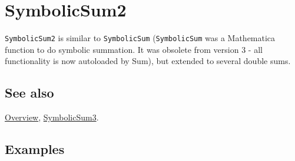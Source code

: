 \documentclass[../FeynCalcManual.tex]{subfiles}
\begin{document}
\hypertarget{symbolicsum2}{%
\section{SymbolicSum2}\label{symbolicsum2}}

\texttt{SymbolicSum2} is similar to \texttt{SymbolicSum}
(\texttt{SymbolicSum} was a Mathematica function to do symbolic
summation. It was obsolete from version 3 - all functionality is now
autoloaded by Sum), but extended to several double sums.

\subsection{See also}

\hyperlink{toc}{Overview}, \hyperlink{symbolicsum3}{SymbolicSum3}.

\subsection{Examples}
\end{document}
